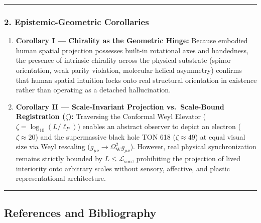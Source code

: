 \documentclass[
]{article}
\providecommand{\tightlist}{%
  \setlength{\itemsep}{0pt}\setlength{\parskip}{0pt}}
\begin{document}
\begin{center}\rule{0.5\linewidth}{0.5pt}\end{center}

\subsubsection{2. Epistemic-Geometric
Corollaries}\label{epistemic-geometric-corollaries}

\begin{enumerate}
\def\labelenumi{\arabic{enumi}.}
\tightlist
\item
  \textbf{Corollary I --- Chirality as the Geometric Hinge:} Because
  embodied human spatial projection possesses built-in rotational axes
  and handedness, the presence of intrinsic chirality across the
  physical substrate (spinor orientation, weak parity violation,
  molecular helical asymmetry) confirms that human spatial intuition
  locks onto real structural orientation in existence rather than
  operating as a detached hallucination.
\item
  \textbf{Corollary II --- Scale-Invariant Projection vs.~Scale-Bound
  Registration (\(\zeta\)):} Traversing the Conformal Weyl Elevator
  (\(\zeta = \log_{10}(L/\ell_P)\)) enables an abstract observer to
  depict an electron (\(\zeta \approx 20\)) and the supermassive black
  hole TON 618 (\(\zeta \approx 49\)) at equal visual size via Weyl
  rescaling (\(g_{\mu\nu} \to \Omega_{\mathrm{W}}^2 g_{\mu\nu}\)).
  However, real physical synchronization remains strictly bounded by
  \(L \le \mathcal{L}_{\mathrm{sim}}\), prohibiting the projection of
  lived interiority onto arbitrary scales without sensory, affective,
  and plastic representational architecture.
\end{enumerate}

\begin{center}\rule{0.5\linewidth}{0.5pt}\end{center}

\subsection{References and
Bibliography}\label{references-and-bibliography}
\end{document}
